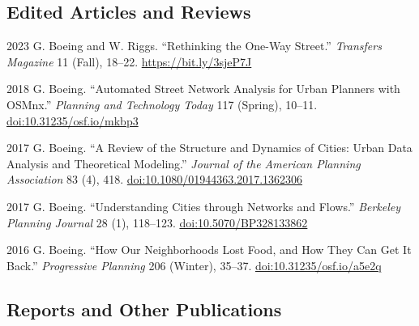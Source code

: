 \documentclass[11pt,letterpaper]{report}
\begin{document}
    \subsection*{Edited Articles and Reviews}

    \begin{tablist}

        \item[2023] \tab{}G. Boeing and W. Riggs. \enquote{Rethinking the One-Way Street.} \textit{Transfers Magazine} 11 (Fall), 18--22. \href{https://bit.ly/3sjeP7J}{https://bit.ly/3sjeP7J}

        \item[2018] \tab{}G. Boeing. \enquote{Automated Street Network Analysis for Urban Planners with OSMnx.} \textit{Planning and Technology Today} 117 (Spring), 10--11. \href{https://doi.org/10.31235/osf.io/mkbp3}{doi:10.31235/osf.io/mkbp3}

        \item[2017] \tab{}G. Boeing. \enquote{A Review of the Structure and Dynamics of Cities: Urban Data Analysis and Theoretical Modeling.} \textit{Journal of the American Planning Association} 83 (4), 418. \href{https://doi.org/10.1080/01944363.2017.1362306}{doi:10.1080/01944363.2017.1362306}

        \item[2017] \tab{}G. Boeing. \enquote{Understanding Cities through Networks and Flows.} \textit{Berkeley Planning Journal} 28 (1), 118--123. \href{https://doi.org/10.5070/BP328133862}{doi:10.5070/BP328133862}

        \item[2016] \tab{}G. Boeing. \enquote{How Our Neighborhoods Lost Food, and How They Can Get It Back.} \textit{Progressive Planning} 206 (Winter), 35--37. \href{https://doi.org/10.31235/osf.io/a5e2q}{doi:10.31235/osf.io/a5e2q}

    \end{tablist}



    \subsection*{Reports and Other Publications}
\end{document}
